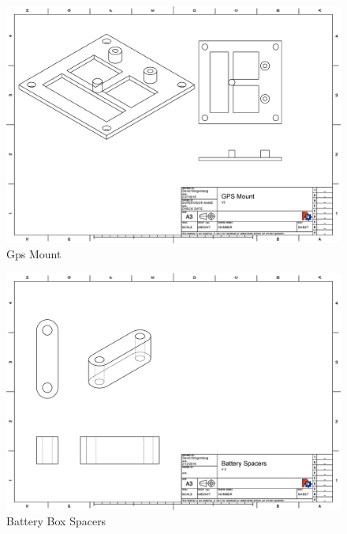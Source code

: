 \documentclass[pdftex,11pt]{article}
\begin{document}
\begin{figure}[!h]
	\centering
		\includegraphics[width=1\textwidth]{./graphics/gps_mountV2.eps}
	\caption{Gps Mount}
	\label{fig:gpsmount}
\end{figure}

\begin{figure}[!h]
	\centering
		\includegraphics[width=1\textwidth]{./graphics/spacers_battery.eps}
	\caption{Battery Box Spacers}
	\label{fig:batteryspacers}
\end{figure}
\end{document}

